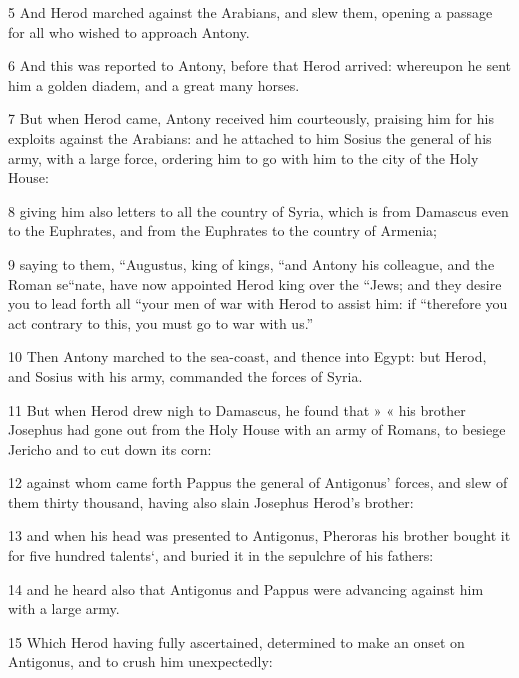 \par 5 And Herod marched against the Arabians, and slew them, opening a passage for all who wished to approach Antony. 

\par 6 And this was reported to Antony, before that Herod arrived: whereupon he sent him a golden diadem, and a great many horses. 

\par 7 But when Herod came, Antony received him courteously, praising him for his exploits against the Arabians: and he attached to him Sosius the general of his army, with a large force, ordering him to go with him to the city of the Holy House: 

\par 8 giving him also letters to all the country of Syria, which is from Damascus even to the Euphrates, and from the Euphrates to the country of Armenia; 

\par 9 saying to them, “Augustus, king of kings, “and Antony his colleague, and the Roman se“nate, have now appointed Herod king over the “Jews; and they desire you to lead forth all “your men of war with Herod to assist him: if “therefore you act contrary to this, you must go to war with us.” 

\par 10 Then Antony marched to the sea-coast, and thence into Egypt: but Herod, and Sosius with his army, commanded the forces of Syria. 

\par 11 But when Herod drew nigh to Damascus, he found that » « his brother Josephus had gone out from the Holy House with an army of Romans, to besiege Jericho and to cut down its corn: 

\par 12 against whom came forth Pappus the general of Antigonus’ forces, and slew of them thirty thousand, having also slain Josephus Herod’s brother: 

\par 13 and when his head was presented to Antigonus, Pheroras his brother bought it for five hundred talents‘, and buried it in the sepulchre of his fathers: 

\par 14 and he heard also that Antigonus and Pappus were advancing against him with a large army. 

\par 15 Which Herod having fully ascertained, determined to make an onset on Antigonus, and to crush him unexpectedly: 

